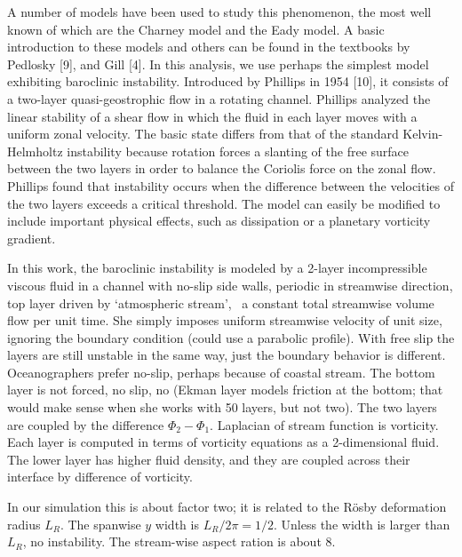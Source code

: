 A number of models have been used to study this phenomenon, the most well
known of which are the Charney model and the Eady model. A basic
introduction to these models and others can be found in the textbooks by
Pedlosky [9], and Gill [4]. In this analysis, we use perhaps the simplest
model exhibiting baroclinic instability. Introduced by Phillips in 1954
[10], it consists of a two-layer quasi-geostrophic flow in a rotating
channel.
Phillips analyzed the linear stability of a shear flow in which the fluid
in each layer moves with a uniform zonal velocity. The basic state
differs from that of the standard Kelvin-Helmholtz instability because
rotation forces a slanting of the free surface between the two layers in
order to balance the Coriolis force on the zonal flow. Phillips found
that instability occurs when the difference between the velocities of the
two layers exceeds a critical threshold. The model can easily be modified
to include important physical effects, such as dissipation or a planetary
vorticity gradient.

In this work, the baroclinic instability is modeled by a 2-layer
incompressible viscous fluid in a channel with no-slip side walls,
periodic in streamwise direction, top layer driven by `atmospheric
stream', \ie\ a constant total streamwise volume flow per unit time. She
simply imposes uniform streamwise velocity of unit size, ignoring the
boundary condition (could use a parabolic profile). With free slip the
layers are still unstable in the same way, just the boundary behavior is
different. Oceanographers prefer no-slip, perhaps because of coastal
stream. The bottom layer is not forced, no slip, no
(Ekman layer models friction at the bottom; that would make sense when
she works with 50 layers, but not two). The two layers are coupled by the
difference $\Phi_2 - \Phi_1$. Laplacian of stream function is vorticity.
Each layer is computed in terms of vorticity equations as a 2-dimensional
fluid. The lower layer has higher fluid density, and they are coupled
across their interface by difference of vorticity.

In our simulation this is about factor two; it is related to the
R\"osby deformation radius $L_R$. The spanwise $y$ width is $L_R/2\pi =
1/2$. Unless the width is larger than $L_R$, no instability. The
stream-wise aspect ration is about 8.



